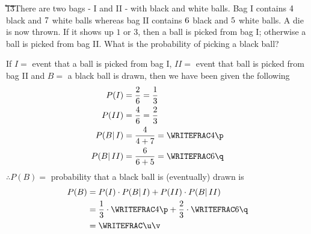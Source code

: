 


\ADD\vbone\vbtwo\p
\ADD\vbthree\vbfour\q
\MULTIPLY{}\r
\FRACADD\vbone\p\r\q\s\t
\FRACMULT\s\t{1}{3}\u\v

\question[2] There are two bags - I and II - with black and white balls. Bag I contains $4$ black 
and $7$ white balls whereas bag II contains $6$ black and $5$ white balls. A die
is now thrown. If it shows up $1$ or $3$, then a ball is picked from bag I; otherwise a ball is picked
from bag II. What is the probability of picking a black ball?


\watchout[-50pt]

\ifprintanswers
\fi 

\begin{solution}[\halfpage]
	If $I =$ event that a ball is picked from bag I, $II=$ event that ball is picked from bag II
	and $B =$ a black ball is drawn, then we have been given the following
	\begin{align}
		P(I) &= \dfrac{2}{6} = \dfrac{1}{3} \\
		P(II) &= \dfrac{4}{6} = \dfrac{2}{3} \\
		P(B\vert\,I) &= \dfrac{\vbone}{\vbone+\vbtwo} = \WRITEFRAC\vbone\p \\
		P(B\vert\,II) &= \dfrac{\vbthree}{\vbthree+\vbfour} = \WRITEFRAC\vbthree\q
	\end{align}
	$\therefore P(B) = $ probability that a black ball is (eventually) drawn is
	\begin{align}
		P(B) &= P(I)\cdot P(B\vert\,I) + P(II)\cdot P(B\vert\, II) \\
		&= \dfrac{1}{3}\cdot\WRITEFRAC\vbone\p + \dfrac{2}{3}\cdot\WRITEFRAC\vbthree\q \\
		&= \WRITEFRAC\u\v
	\end{align}
\end{solution}


